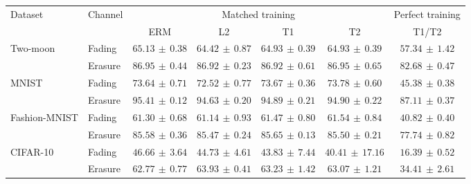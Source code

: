 \begin{tabular*}{\linewidth}{@{\extracolsep{\fill}}llccccc@{}}
\toprule
\multirow{2}{*}{Dataset} & \multirow{2}{*}{Channel} & \multicolumn{4}{c}{Matched training} & Perfect training \\
\cmidrule(lr){3-6}\cmidrule(l){7-7}
 & & ERM & L2 & T1 & T2 & T1/T2 \\
\midrule
\multirow{2}{*}{Two-moon} & Fading & $\mathbf{65.13}\,\pm\,0.38$ & $64.42\,\pm\,0.87$ & $64.93\,\pm\,0.39$ & $64.93\,\pm\,0.39$ & $57.34\,\pm\,1.42$ \\
 & Erasure & $86.95\,\pm\,0.44$ & $86.92\,\pm\,0.23$ & $86.92\,\pm\,0.61$ & $\mathbf{86.95}\,\pm\,0.65$ & $82.68\,\pm\,0.47$ \\
\midrule[0.25pt]
\multirow{2}{*}{MNIST} & Fading & $73.64\,\pm\,0.71$ & $72.52\,\pm\,0.77$ & $73.67\,\pm\,0.36$ & $\mathbf{73.78}\,\pm\,0.60$ & $45.38\,\pm\,0.38$ \\
 & Erasure & $\mathbf{95.41}\,\pm\,0.12$ & $94.63\,\pm\,0.20$ & $94.89\,\pm\,0.21$ & $94.90\,\pm\,0.22$ & $87.11\,\pm\,0.37$ \\
\midrule[0.25pt]
\multirow{2}{*}{Fashion-MNIST} & Fading & $61.30\,\pm\,0.68$ & $61.14\,\pm\,0.93$ & $61.47\,\pm\,0.80$ & $\mathbf{61.54}\,\pm\,0.84$ & $40.82\,\pm\,0.40$ \\
 & Erasure & $85.58\,\pm\,0.36$ & $85.47\,\pm\,0.24$ & $\mathbf{85.65}\,\pm\,0.13$ & $85.50\,\pm\,0.21$ & $77.74\,\pm\,0.82$ \\
\midrule[0.25pt]
\multirow{2}{*}{CIFAR-10} & Fading & $\mathbf{46.66}\,\pm\,3.64$ & $44.73\,\pm\,4.61$ & $43.83\,\pm\,7.44$ & $40.41\,\pm\,17.16$ & $16.39\,\pm\,0.52$ \\
 & Erasure & $62.77\,\pm\,0.77$ & $\mathbf{63.93}\,\pm\,0.41$ & $63.23\,\pm\,1.42$ & $63.07\,\pm\,1.21$ & $34.41\,\pm\,2.61$ \\
\bottomrule
\end{tabular*}
